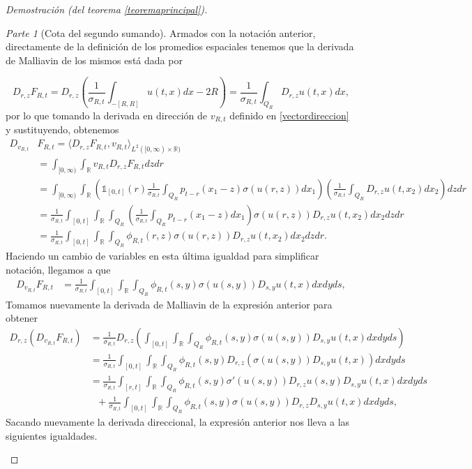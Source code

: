 \documentclass[letterpaper,twoside,12pt]{book}
\newcommand{\R}{\mathbb{R}}
\newcommand{\1}{\mathds{1}}
\theoremstyle{definition}
\theoremstyle{definition}
\theoremstyle{remark}
\newtheorem{proofpart}{Parte}
\theoremstyle{definition}
\theoremstyle{definition}
\theoremstyle{definition}
\theoremstyle{definition}
\theoremstyle{definition}
\begin{document}
\begin{proof}[Demostración (del teorema \ref{teoremaprincipal})]
\begin{proofpart}[Cota del segundo sumando]
Armados con la notación anterior, directamente de la definición de los promedios espaciales tenemos que la derivada de Malliavin de los mismos está dada por 

\[
   D_{r,z}F_{R,t}=D_{r,z}\left(\frac{1}{\sigma_{R,t}}\int_{-[R,R]}u(t,x)dx-2R\right)=\frac{1}{\sigma_{R,t}}\int_{Q_R}D_{r,z}u(t,x)dx,
\]
por lo que tomando la derivada en dirección de $v_{R,t}$ definido en \eqref{vectordireccion} y sustituyendo, obtenemos 
\begin{align*}
   D_{v_{R,t}}&F_{R,t}=\langle D_{r,z}F_{R,t},v_{R,t}\rangle_{L^{2}([0,\infty)\times\R)}\\
   &=\int_{[0,\infty)}\int_\R v_{R,t}D_{r,z}F_{R,t}dz dr\\
   &=\int_{[0,\infty)}\int_\R\left(\1_{[0,t]}(r)\frac{1}{\sigma_{R,t}}\int_{Q_R}p_{t-r}(x_1-z)\sigma(u(r,z))dx_1\right)\left(\frac{1}{\sigma_{R,t}}\int_{Q_R}D_{r,z}u(t,x_2)dx_2\right) dz dr\\
   &=\frac{1}{\sigma_{R,t}}\int_{[0,t]}\int_\R \int_{Q_R}\left(\frac{1}{\sigma_{R,t}}\int_{Q_R}p_{t-r}(x_1-z)dx_1\right)\sigma(u(r,z))D_{r,z}u(t,x_2) dx_2dz dr\\
   &=\frac{1}{\sigma_{R,t}}\int_{[0,t]}\int_\R \int_{Q_R}\phi_{R,t}(r,z)\sigma(u(r,z))D_{r,z}u(t,x_2) dx_2dz dr.
\end{align*}
Haciendo un cambio de variables en esta última igualdad para simplificar notación, llegamos a que
\begin{align*}
D_{v_{R,t}}F_{R,t}&=\frac{1}{\sigma_{R,t}}\int_{[0,t]}\int_\R \int_{Q_R}\phi_{R,t}(s,y)\sigma(u(s,y))D_{s,y}u(t,x) dx dy ds,
\end{align*}
 Tomamos nuevamente la derivada de Malliavin de la expresión anterior para obtener 
\begin{align*}
   D_{r,z}(D_{v_{R,t}}F_{R,t})&=\frac{1}{\sigma_{R,t}}D_{r,z}\left(\int_{[0,t]}\int_\R \int_{Q_R}\phi_{R,t}(s,y)\sigma(u(s,y))D_{s,y}u(t,x) dx dy ds\right)\\
   &=\frac{1}{\sigma_{R,t}}\int_{[0,t]}\int_\R \int_{Q_R}\phi_{R,t}(s,y)D_{r,z}\left(\sigma(u(s,y))D_{s,y}u(t,x)\right) dx dy ds\\
   &=\frac{1}{\sigma_{R,t}}\int_{[r,t]}\int_\R \int_{Q_R}\phi_{R,t}(s,y)\sigma'(u(s,y))D_{r,z}u(s,y)D_{s,y}u(t,x)dx dy ds\\
   & \ \ \ +\frac{1}{\sigma_{R,t}}\int_{[0,t]}\int_\R \int_{Q_R}\phi_{R,t}(s,y)\sigma(u(s,y))D_{r,z}D_{s,y}u(t,x)dx dy ds,
\end{align*}
Sacando nuevamente la derivada direccional, la expresión anterior nos lleva a las siguientes igualdades.

\end{proofpart}
\end{proof}
\end{document}
